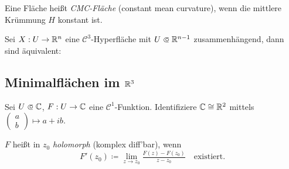 \documentclass{cheat-sheet}
\begin{document}
\begin{defn}
  Eine Fläche heißt \emph{CMC-Fläche} (constant mean curvature), wenn die mittlere Krümmung $H$ konstant ist.
\end{defn}

\begin{samepage}

\begin{satz}
  Sei $X : U \to \mathbb{R}^n$ eine $\mathcal{C}^3$-Hyperfläche mit $U \opn \R^{n-1}$ zusammenhängend, dann sind äquivalent:
  \begin{itemize}
  \end{itemize}
\end{satz}

\subsection{Minimalflächen im $\mathbb{R}^3$}

\end{samepage}





\begin{situation}
  Sei $U \opn \C$, $F : U \to \mathbb{C}$ eine $\mathcal{C}^1$-Funktion. Identifiziere $\mathbb{C} \cong \mathbb{R}^2$ mittels $\left( \begin{smallmatrix} a \\ b \end{smallmatrix} \right) \mapsto a + ib$.
\end{situation}

\begin{defn}
  $F$ heißt in $z_0$ \emph{holomorph} (komplex diff'bar), wenn
  \[ F'(z_0) \coloneqq \lim_{z \to z_0} \tfrac{F(z) - F(z_0)}{z - z_0} \quad \text{existiert.} \]
\end{defn}
\end{document}
